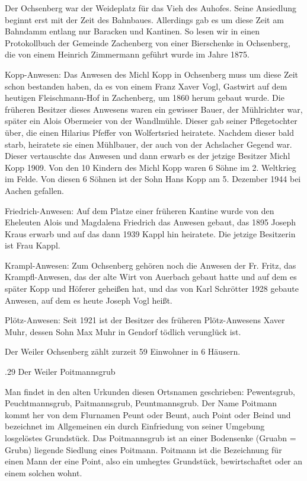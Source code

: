 \documentclass{book}
\begin{document}
Der Ochsenberg war der Weideplatz für das Vieh des Auhofes. Seine Ansiedlung
beginnt erst mit der Zeit des Bahnbaues. Allerdings gab es um diese Zeit am
Bahndamm entlang nur Baracken und Kantinen. So lesen wir in einen Protokollbuch
der Gemeinde Zachenberg von einer Bierschenke in Ochsenberg, die von einem
Heinrich Zimmermann geführt wurde im Jahre 1875.

Kopp-Anwesen: Das Anwesen des Michl Kopp in Ochsenberg muss um diese Zeit schon
bestanden haben, da es von einem Franz Xaver Vogl, Gastwirt auf dem heutigen
Fleischmann-Hof in Zachenberg, um 1860 herum gebaut wurde. Die früheren Besitzer
dieses Anwesens waren ein gewisser Bauer, der Mühlrichter war, später ein Alois
Obermeier von der Wandlmühle. Dieser gab seiner Pflegetochter über, die einen
Hilarius Pfeffer von Wolfertsried heiratete. Nachdem dieser bald starb,
heiratete sie einen Mühlbauer, der auch von der Achslacher Gegend war. Dieser
vertauschte das Anwesen und dann erwarb es der jetzige Besitzer Michl Kopp 1909.
Von den 10 Kindern des Michl Kopp waren 6 Söhne im 2. Weltkrieg im Felde. Von
diesen 6 Söhnen ist der Sohn Hans Kopp am 5. Dezember 1944 bei Aachen gefallen.

Friedrich-Anwesen: Auf dem Platze einer früheren Kantine wurde von den Eheleuten
Alois und Magdalena Friedrich das Anwesen gebaut, das 1895 Joseph Kraus erwarb
und auf das dann 1939 Kappl hin heiratete. Die jetzige Besitzerin ist Frau
Kappl.

Krampl-Anwesen: Zum Ochsenberg gehören noch die Anwesen der Fr. Fritz, das
Krampfl-Anwesen, das der alte Wirt von Auerbach gebaut hatte und auf dem es
später Kopp und Höferer geheißen hat, und das von Karl Schrötter 1928 gebaute
Anwesen, auf dem es heute Joseph Vogl heißt.

Plötz-Anwesen: Seit 1921 ist der Besitzer des früheren Plötz-Anwesens Xaver
Muhr, dessen Sohn Max Muhr in Gendorf tödlich verunglück ist.

Der Weiler Ochsenberg zählt zurzeit 59 Einwohner in 6 Häusern.

.29 Der Weiler Poitmannsgrub

Man findet in den alten Urkunden diesen Ortsnamen geschrieben: Pewentsgrub,
Peuchtmannsgrub, Paitmannsgrub, Peuntmannsgrub. Der Name Poitmann kommt her von
dem Flurnamen Peunt oder Beunt, auch Point oder Beind und bezeichnet im
Allgemeinen ein durch Einfriedung von seiner Umgebung losgelöstes Grundstück.
Das Poitmannsgrub ist an einer Bodensenke (Gruabn = Grubn) liegende Siedlung
eines Poitmann. Poitmann ist die Bezeichnung für einen Mann der eine Point, also
ein umhegtes Grundstück, bewirtschaftet oder an einem solchen wohnt.
\end{document}
